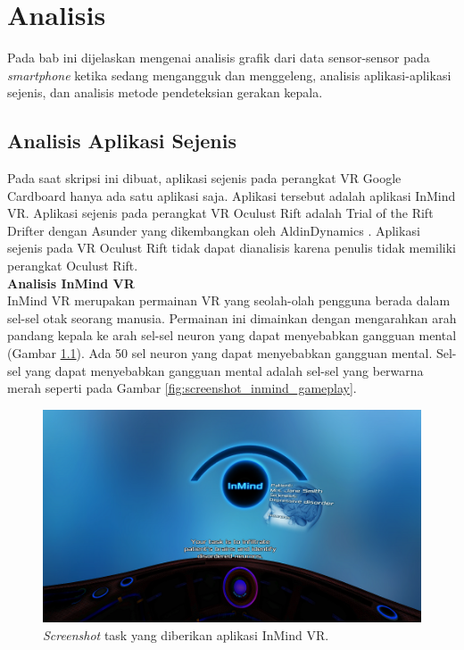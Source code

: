 \chapter{Analisis}
\label{chap:analisis}

Pada bab ini dijelaskan mengenai analisis grafik dari data sensor-sensor pada \textit{smartphone} ketika sedang mengangguk dan menggeleng, analisis aplikasi-aplikasi sejenis, dan analisis metode pendeteksian gerakan kepala. 

\section{Analisis Aplikasi Sejenis}
\label{sec:analisis_aplikasi_sejenis}

Pada saat skripsi ini dibuat, aplikasi sejenis pada perangkat VR Google Cardboard hanya ada satu aplikasi saja. Aplikasi tersebut adalah aplikasi InMind VR. Aplikasi sejenis pada perangkat VR Oculust Rift adalah Trial of the Rift Drifter dengan Asunder yang dikembangkan oleh AldinDynamics \cite{aldin_dynamics}. Aplikasi sejenis pada VR Oculust Rift tidak dapat dianalisis karena penulis tidak memiliki perangkat Oculust Rift. \\

\textbf{Analisis InMind VR}\\

InMind VR merupakan permainan VR yang seolah-olah pengguna berada dalam sel-sel otak seorang manusia. Permainan ini dimainkan dengan mengarahkan arah pandang kepala ke arah sel-sel neuron yang dapat menyebabkan gangguan mental (Gambar \ref{fig:screenshot_inmind_task}). Ada 50 sel neuron yang dapat menyebabkan gangguan mental. Sel-sel yang dapat menyebabkan gangguan mental adalah sel-sel yang berwarna merah seperti pada Gambar \ref{fig:screenshot_inmind_gameplay}.

\begin{figure}[htbp]
\centering
\includegraphics[scale=0.6]{Gambar/screenshot-inmind-task.png}
\caption{\textit{Screenshot} task yang diberikan aplikasi InMind VR.}
\label{fig:screenshot_inmind_task}
\end{figure}

